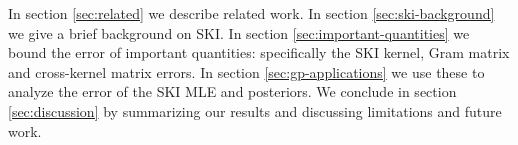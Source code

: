 
In section \ref{sec:related} we describe related work. In section \ref{sec:ski-background} we give a brief background on SKI. In section \ref{sec:important-quantities} we bound the error of important quantities: specifically the SKI kernel, Gram matrix and cross-kernel matrix errors. In section \ref{sec:gp-applications} we use these to analyze the error of the SKI MLE and posteriors. We conclude in section \ref{sec:discussion} by summarizing our results and discussing limitations and future work.